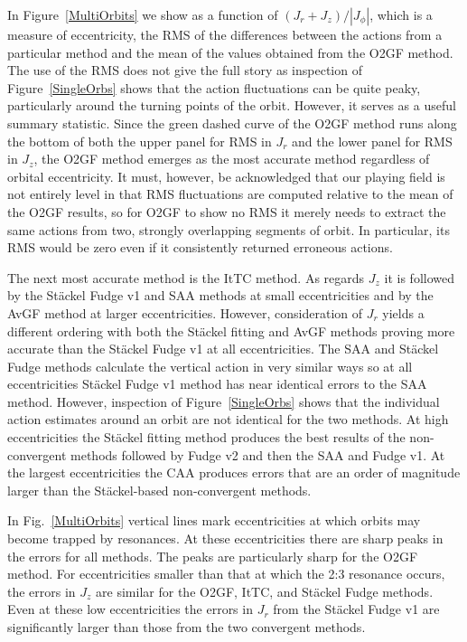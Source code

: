 \documentclass[useAMS,usenatbib,fleqn,a4paper]{mn2e}
\begin{document}
In Figure~\ref{MultiOrbits} we show as a function of $(J_r+J_z)/|J_\phi|$,
which is a measure of eccentricity, the RMS of the differences between the
actions from a particular method and the mean of the values obtained from the
O2GF method. The use of the RMS does not give the full story as inspection of Figure~\ref{SingleOrbs} shows that the action fluctuations can be quite peaky, particularly around the turning points of the orbit. However, it serves as a useful summary statistic. Since the green dashed curve of the O2GF method runs along the
bottom of both the upper panel for RMS in $J_r$ and the lower panel for RMS
in $J_z$, the O2GF method emerges as the most accurate method regardless of
orbital eccentricity. It must, however, be acknowledged that our playing
field is not entirely level in that RMS fluctuations are computed relative to
the mean of the O2GF results, so for O2GF to show no RMS it merely needs to
extract the same actions from two, strongly overlapping segments of orbit.
In particular, its RMS would be zero even if it consistently returned
erroneous actions.

The next most accurate method is the ItTC method. As regards $J_z$ it
is followed by the St\"ackel Fudge v1 and SAA methods at small eccentricities and by the AvGF method at larger eccentricities. However, consideration of $J_r$ yields a
different ordering with both the St\"ackel fitting and AvGF methods
proving more accurate than the St\"ackel Fudge v1 at all eccentricities. The SAA and St\"ackel Fudge methods calculate the vertical action in very similar ways so at all eccentricities St\"ackel Fudge v1 method has near identical errors to the SAA method. However, inspection of Figure~\ref{SingleOrbs} shows that the individual action estimates around an orbit are not identical for the two methods. At high eccentricities the St\"ackel fitting method produces the best results of the non-convergent methods followed by Fudge v2 and then the SAA and Fudge v1. At the largest eccentricities the CAA produces errors that are an order of magnitude larger than the St\"ackel-based non-convergent methods.

In Fig.~\ref{MultiOrbits} vertical lines mark eccentricities at which
orbits may become trapped by resonances. At these eccentricities there are
sharp peaks in the errors for all methods. The peaks are particularly sharp
for the O2GF method. For eccentricities smaller than that at which the 2:3
resonance occurs, the errors in $J_z$ are similar for the O2GF, ItTC,
and St\"ackel Fudge methods. Even at these low eccentricities the errors in
$J_r$ from the St\"ackel Fudge v1 are significantly larger than those from
the two convergent methods.
\end{document}
